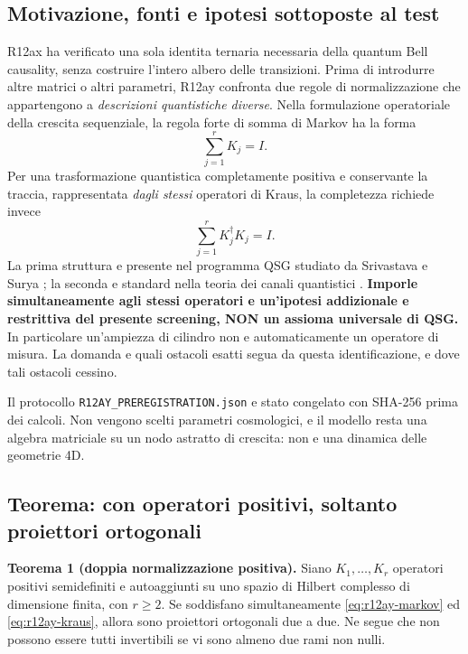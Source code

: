 \documentclass[11pt,a4paper]{article}
\begin{document}
\subsection{Motivazione, fonti e ipotesi sottoposte al test}
R12ax ha verificato una sola identita ternaria necessaria della quantum Bell causality, senza costruire l'intero albero delle transizioni. Prima di introdurre altre matrici o altri parametri, R12ay confronta due regole di normalizzazione che appartengono a \emph{descrizioni quantistiche diverse}. Nella formulazione operatoriale della crescita sequenziale, la regola forte di somma di Markov ha la forma
\begin{equation}
 \sum_{j=1}^r K_j=I.
 \label{eq:r12ay-markov}
\end{equation}
Per una trasformazione quantistica completamente positiva e conservante la traccia, rappresentata \emph{dagli stessi} operatori di Kraus, la completezza richiede invece
\begin{equation}
 \sum_{j=1}^r K_j^\dagger K_j=I.
 \label{eq:r12ay-kraus}
\end{equation}
La prima struttura e presente nel programma QSG studiato da Srivastava e Surya \cite{SrivastavaSurya2026}; la seconda e standard nella teoria dei canali quantistici \cite{Watrous2018}. \textbf{Imporle simultaneamente agli stessi operatori e un'ipotesi addizionale e restrittiva del presente screening, NON un assioma universale di QSG.} In particolare un'ampiezza di cilindro non e automaticamente un operatore di misura. La domanda e quali ostacoli esatti segua da questa identificazione, e dove tali ostacoli cessino.

Il protocollo \texttt{R12AY\_PREREGISTRATION.json} e stato congelato con SHA-256 prima dei calcoli. Non vengono scelti parametri cosmologici, e il modello resta una algebra matriciale su un nodo astratto di crescita: non e una dinamica delle geometrie 4D.

\subsection{Teorema: con operatori positivi, soltanto proiettori ortogonali}
\textbf{Teorema 1 (doppia normalizzazione positiva).} Siano $K_1,\ldots,K_r$ operatori positivi semidefiniti e autoaggiunti su uno spazio di Hilbert complesso di dimensione finita, con $r\ge2$. Se soddisfano simultaneamente \eqref{eq:r12ay-markov} ed \eqref{eq:r12ay-kraus}, allora sono proiettori ortogonali due a due. Ne segue che non possono essere tutti invertibili se vi sono almeno due rami non nulli.
\end{document}
